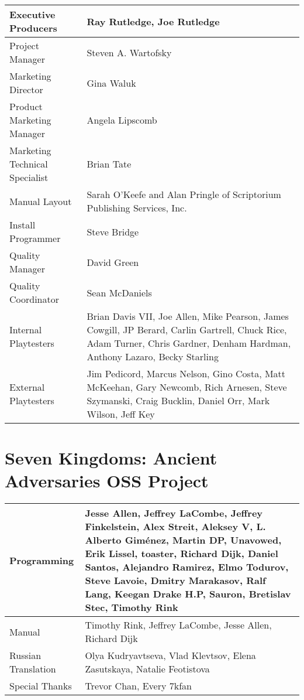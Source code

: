 \begin{tabular}{ | p{4cm} | p{9cm} |}
	\hline
	Executive Producers	& Ray Rutledge, Joe Rutledge \\ \hline
Project Manager	& Steven A. Wartofsky \\ \hline
Marketing Director	& Gina Waluk \\ \hline
Product Marketing Manager	& Angela Lipscomb \\ \hline
Marketing Technical Specialist	& Brian Tate \\ \hline
Manual Layout	& Sarah O’Keefe and Alan Pringle of Scriptorium Publishing Services, Inc. \\ \hline
Install Programmer	& Steve Bridge \\ \hline
Quality Manager	& David Green \\ \hline
Quality Coordinator	& Sean McDaniels \\ \hline
Internal Playtesters	& Brian Davis VII, Joe Allen, Mike Pearson, James Cowgill, JP Berard, Carlin Gartrell, Chuck Rice, Adam Turner, Chris Gardner, Denham Hardman, Anthony Lazaro, Becky Starling \\ \hline
External Playtesters	& Jim Pedicord, Marcus Nelson, Gino Costa, Matt McKeehan, Gary Newcomb, Rich Arnesen, Steve Szymanski, Craig Bucklin, Daniel Orr, Mark Wilson, Jeff Key \\ \hline
	\hline
\end{tabular}

\section{Seven Kingdoms: Ancient Adversaries OSS Project}

\begin{tabular}{ | p{4cm} | p{9cm} |}
	\hline
	Programming	& Jesse Allen, Jeffrey LaCombe, Jeffrey Finkelstein, Alex Streit, Aleksey V, L. Alberto Giménez, Martin DP, Unavowed, Erik Lissel, toaster, Richard Dijk, Daniel Santos, Alejandro Ramirez, Elmo Todurov, Steve Lavoie, Dmitry Marakasov, Ralf Lang, Keegan Drake H.P, Sauron, Bretislav Stec, Timothy Rink \\ \hline
Manual & Timothy Rink, Jeffrey LaCombe, Jesse Allen, Richard Dijk \\ \hline
Russian Translation	& Olya Kudryavtseva, Vlad Klevtsov, Elena Zasutskaya, Natalie Feotistova \\ \hline
Special Thanks	& Trevor Chan, Every 7kfan \\ \hline
	\hline
\end{tabular}
